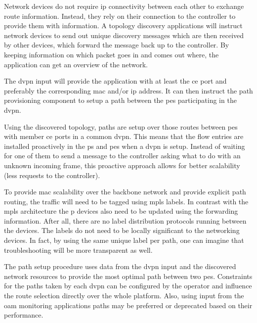 \begin{description}[leftmargin=!,labelwidth=\widthof{\bfseries Topology Discovery}]
	\item[Topology Discovery] Network devices do not require \ac{ip} connectivity between each other to exchange route information. Instead, they rely on their connection to the controller to provide them with information. A topology discovery applications will instruct network devices to send out unique discovery messages which are then received by other devices, which forward the message back up to the controller. By keeping information on which packet goes in and comes out where, the application can get an overview of the network.
	
	\item[\ac{dvpn} Provisioning] The \ac{dvpn} input will provide the application with at least the \ac{ce} port and preferably the corresponding \ac{mac} and/or \ac{ip} address. It can then instruct the path provisioning component to setup a path between the \acp{pe} participating in the \ac{dvpn}. 
	
	\item[Path Provisioning] Using the discovered topology, paths are setup over those routes between \acp{pe} with member \ac{ce} ports in a common \ac{dvpn}. This means that the flow entries are installed proactively in the \acp{p} and \acp{pe} when a \ac{dvpn} is setup. Instead of waiting for one of them to send a message to the controller asking what to do with an unknown incoming frame, this proactive approach allows for better scalability (less requests to the controller).
	
	To provide \ac{mac} scalability over the backbone network and provide explicit path routing, the traffic will need to be tagged using \ac{mpls} labels. In contrast with the \ac{mpls} architecture the \ac{p} devices also need to be updated using the forwarding information. After all, there are no label distribution protocols running between the devices. The labels do not need to be locally significant to the networking devices. In fact, by using the same unique label per path, one can imagine that troubleshooting will be more transparent as well.
	\item[Traffic Engineering] The path setup procedure uses data from the \ac{dvpn} input and the discovered network resources to provide the most optimal path between two \acp{pe}. Constraints for the paths taken by each \ac{dvpn} can be configured by the operator and influence the route selection directly over the whole platform. Also, using input from the \ac{oam} monitoring applications paths may be preferred or deprecated based on their performance.
	

\end{description}
